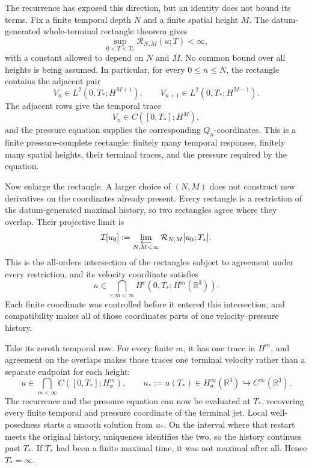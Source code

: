 The recurrence has exposed this direction, but an identity does not bound its
terms. Fix a finite temporal depth \(N\) and a finite spatial height \(M\). The
datum-generated whole-terminal rectangle theorem gives
\[
\sup_{0<T<T_*}\mathcal R_{N,M}(u;T)<\infty,
\]
with a constant allowed to depend on \(N\) and \(M\). No common bound over all
heights is being assumed. In particular, for every \(0\le n\le N\), the
rectangle contains the adjacent pair
\[
V_n\in L^2(0,T_*;H^{M+1}),
\qquad
V_{n+1}\in L^2(0,T_*;H^{M-1}).
\]
The adjacent rows give the temporal trace
\[
V_n\in C([0,T_*];H^M),
\]
and the pressure equation supplies the corresponding \(Q_n\)-coordinates.
This is a finite pressure-complete rectangle: finitely many temporal responses,
finitely many spatial heights, their terminal traces, and the pressure required
by the equation.

Now enlarge the rectangle. A larger choice of \((N,M)\) does not construct new
derivatives on the coordinates already present. Every rectangle is a
restriction of the datum-generated maximal history, so two rectangles agree
where they overlap. Their projective limit is
\[
\mathcal I[u_0]
:=\varprojlim_{N,M<\infty}\mathcal R_{N,M}[u_0;T_*].
\]
This is the all-orders intersection of the rectangles subject to agreement
under every restriction, and its velocity coordinate satisfies
\[
u\in\bigcap_{r,m<\infty}
H^r(0,T_*;H^m(\mathbb R^3)).
\]
Each finite coordinate was controlled before it entered this intersection, and
compatibility makes all of those coordinates parts of one velocity--pressure
history.

Take its zeroth temporal row. For every finite \(m\), it has one trace in
\(H^m\), and agreement on the overlaps makes those traces one terminal
velocity rather than a separate endpoint for each height:
\[
u\in\bigcap_{m<\infty}C([0,T_*];H^m_\sigma),
\qquad
u_*:=u(T_*)
\in H^\infty_\sigma(\mathbb R^3)
\hookrightarrow C^\infty(\mathbb R^3).
\]
The recurrence and the pressure equation can now be evaluated at \(T_*\),
recovering every finite temporal and pressure coordinate of the terminal jet.
Local well-posedness starts a smooth solution from \(u_*\). On the interval
where that restart meets the original history, uniqueness identifies the two,
so the history continues past \(T_*\). If \(T_*\) had been a finite maximal
time, it was not maximal after all. Hence \(T_*=\infty\).

